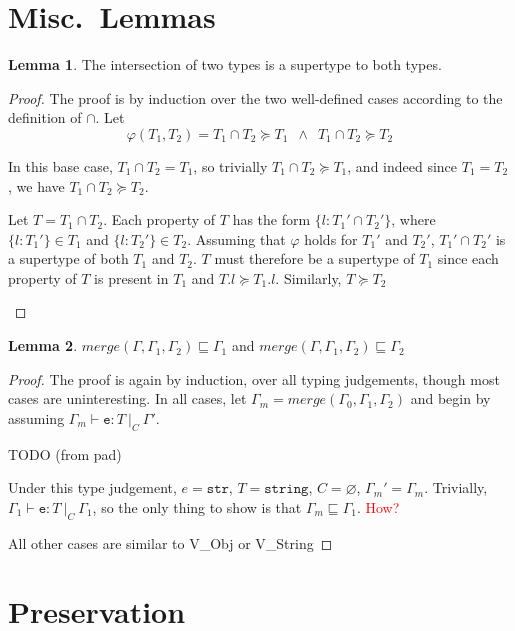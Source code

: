 \documentclass[a4paper]{article}
\theoremstyle{definition}
\theoremstyle{dotless}
\newtheorem{lemma}{Lemma}[section]
\begin{document}
\section{Misc.~Lemmas}
\begin{lemma}\label{typeIntersect}
  The intersection of two types is a supertype to both types.
\end{lemma}
\begin{proof}
  The proof is by induction over the two well-defined cases according to the
  definition of $\cap$. Let 
  \begin{equation*}
	\varphi(T_1, T_2) = 
		T_1\cap T_2 \succeq T_1
 			\enspace \land \enspace
 		T_1\cap T_2 \succeq T_2
  \end{equation*}
  \begin{case}[$T_1 = T_2$]

	In this base case, $T_1 \cap T_2 = T_1$, so trivially 
	$T_1 \cap T_2 \succeq T_1$, and indeed since $T_1 = T_2$, we have 
	$T_1 \cap T_2 \succeq T_2$.

  	\end{case}
  	\begin{case}
	Let $T = T_1\cap T_2$. Each property of $T$ has the form $\{l : T_1' \cap T_2' \}$,
	where $\{l:T_1'\} \in T_1$ and $\{l:T_2'\} \in T_2$. Assuming that
	$\varphi$ holds for $T_1'$ and $T_2'$, $T_1' \cap T_2'$ is a supertype of
	both $T_1$ and $T_2$. $T$ must therefore be a supertype of $T_1$
	since each property of $T$ is present in $T_1$ and $T.l \succeq T_1.l$.
	Similarly, $T\succeq T_2$

  \end{case}

\end{proof}

\begin{lemma}\label{mergeEnv}
	$merge(\Gamma, \Gamma_1, \Gamma_2) \sqsubseteq \Gamma_1$ and 
	$merge(\Gamma, \Gamma_1, \Gamma_2) \sqsubseteq \Gamma_2$
\end{lemma}
\begin{proof}

  The proof is again by induction, over all typing judgements, though most cases are uninteresting.
  In all cases, let $\Gamma_m = merge(\Gamma_0, \Gamma_1, \Gamma_2)$ and begin by assuming 
	$\Gamma_m \vdash \mathtt{e} : T\ |_C\ \Gamma'$.
  \begin{case}[IdType]
	TODO (from pad)

  \end{case}
  \begin{case}[V\_String]
  	Under this type judgement, $e=\mathtt{str}$, $T=\mathtt{string}$, $C=\varnothing$, $\Gamma_m'=\Gamma_m$.
  	Trivially, $\Gamma_1 \vdash \mathtt{e} : T\ |_C\ \Gamma_1$, so the only
  	thing to show is that $\Gamma_m\sqsubseteq\Gamma_1$. \textcolor{red}{How?}
  \end{case}

	All other cases are similar to V\_Obj or V\_String
\end{proof}
\section{Preservation}
\end{document}
